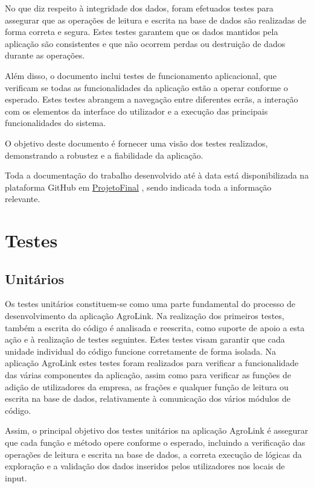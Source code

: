 \documentclass[a4paper,12pt]{report}
\begin{document}
	No que diz respeito à integridade dos dados, foram efetuados testes para assegurar que as operações de leitura e escrita na base de dados são realizadas de forma correta e segura. Estes testes garantem que os dados mantidos pela aplicação são consistentes e que não ocorrem perdas ou destruição de dados durante as operações.
	
	Além disso, o documento inclui testes de funcionamento aplicacional, que verificam se todas as funcionalidades da aplicação estão a operar conforme o esperado. Estes testes abrangem a navegação entre diferentes ecrãs, a interação com os elementos da interface do utilizador e a execução das principais funcionalidades do sistema.
	
	O objetivo deste documento é fornecer uma visão dos testes realizados, demonstrando a robustez e a fiabilidade da aplicação.
		
	Toda a documentação do trabalho desenvolvido até à data está disponibilizada na plataforma GitHub em \href{https://github.com/nunonogueira03/ProjetoFinal}{ProjetoFinal}
	, sendo indicada toda a informação relevante.
	
	\newpage
	\tableofcontents	
	
	\chapter{Testes}
	\section{Unitários}
	Os testes unitários constituem-se como uma parte fundamental do processo de desenvolvimento da aplicação AgroLink. Na realização dos primeiros testes, também a escrita do código é analisada e reescrita, como suporte de apoio a esta ação e à realização de testes seguintes. Estes testes visam garantir que cada unidade individual do código funcione corretamente de forma isolada. Na aplicação AgroLink estes testes foram realizados para verificar a funcionalidade das várias componentes da aplicação, assim como para verificar as funções de adição de utilizadores da empresa, as frações e qualquer função de leitura ou escrita na base de dados, relativamente à comunicação dos vários módulos de código.
	
	Assim, o principal objetivo dos testes unitários na aplicação AgroLink é assegurar que cada função e método opere conforme o esperado, incluindo a verificação das operações de leitura e escrita na base de dados, a correta execução de lógicas da exploração e a validação dos dados inseridos pelos utilizadores nos locais de input.
	
\end{document}
